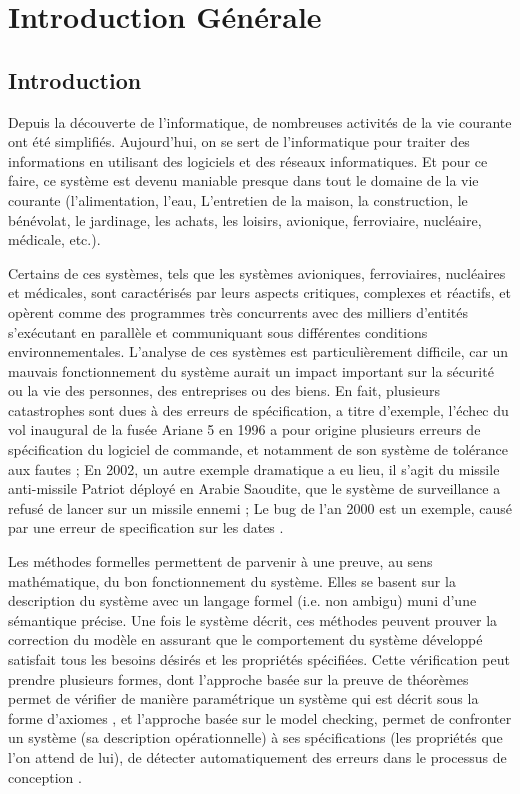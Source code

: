 \chapter{Introduction Générale}
\section{Introduction}
Depuis la découverte de l’informatique, de nombreuses activités de la vie courante ont été simplifiés. Aujourd’hui, on se sert de l’informatique pour traiter des informations en utilisant des logiciels et des réseaux informatiques. Et pour ce faire, ce système est devenu maniable presque dans tout le domaine de la vie courante (l'alimentation, l'eau, L’entretien de la maison, la construction, le bénévolat, le jardinage, les achats, les loisirs, avionique, ferroviaire, nucléaire, médicale, etc.).

Certains de ces systèmes, tels que les systèmes avioniques, ferroviaires, nucléaires et médicales, sont caractérisés par leurs aspects critiques, complexes et réactifs, et opèrent comme des programmes très concurrents avec des milliers d’entités s’exécutant en parallèle et communiquant sous différentes conditions environnementales. L’analyse de ces systèmes est particulièrement difficile, car un mauvais fonctionnement du système aurait un impact important sur la sécurité ou la vie des personnes, des entreprises ou des biens. En fait, plusieurs catastrophes sont dues à des erreurs de spécification, a titre d'exemple, l'échec du vol inaugural de la fusée Ariane 5 en 1996 a pour origine  plusieurs erreurs de spécification du logiciel de commande, et notamment de son système de tolérance aux fautes \cite{arian5}; En 2002, un autre exemple dramatique a eu lieu, il s'agit du missile anti-missile Patriot déployé en Arabie Saoudite, que le système de surveillance a refusé de lancer sur un missile ennemi \cite{patriot}; Le bug de l'an 2000 est un exemple, causé par une erreur de specification sur les dates \cite{bug2000}.

Les méthodes formelles permettent de parvenir à une preuve, au sens mathématique, du bon fonctionnement du système. Elles se basent sur la description du système avec un langage formel (i.e. non ambigu) muni d’une sémantique précise. Une fois le système décrit, ces méthodes peuvent prouver la correction du modèle en assurant que le comportement du système développé satisfait tous les besoins désirés et les propriétés spécifiées. Cette vérification peut prendre plusieurs formes, dont l’approche basée sur la preuve de théorèmes permet de vérifier de manière paramétrique un système qui est décrit sous la forme d’axiomes \cite{Rushby2001}, et l’approche basée sur le model checking, permet de confronter un système (sa description opérationnelle) à ses spécifications (les propriétés que l’on attend de lui), de détecter automatiquement des erreurs dans le processus de conception \cite{Clark1999}.

